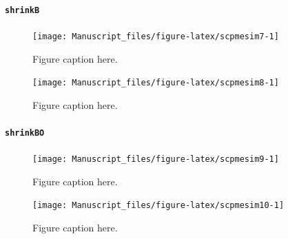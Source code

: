 \documentclass[11pt,]{report}
\let\oldparagraph\paragraph
\renewcommand{\paragraph}[1]{\oldparagraph{#1}\mbox{}}
\begin{document}
\hypertarget{shrinkb}{%
\paragraph{\texorpdfstring{\texttt{shrinkB}}{shrinkB}}\label{shrinkb}}

\vspace{1cm}

\begin{figure}

{\centering \texttt{[image: Manuscript\_files/figure-latex/scpmesim7-1]} 

}

\caption{Figure caption here.}\label{fig:scpmesim7}
\end{figure}

\vspace{1cm}

\begin{figure}

{\centering \texttt{[image: Manuscript\_files/figure-latex/scpmesim8-1]} 

}

\caption{Figure caption here.}\label{fig:scpmesim8}
\end{figure}

\hypertarget{shrinkbo}{%
\paragraph{\texorpdfstring{\texttt{shrinkBO}}{shrinkBO}}\label{shrinkbo}}

\vspace{1cm}

\begin{figure}

{\centering \texttt{[image: Manuscript\_files/figure-latex/scpmesim9-1]} 

}

\caption{Figure caption here.}\label{fig:scpmesim9}
\end{figure}

\vspace{1cm}

\begin{figure}

{\centering \texttt{[image: Manuscript\_files/figure-latex/scpmesim10-1]} 

}

\caption{Figure caption here.}\label{fig:scpmesim10}
\end{figure}

\vspace{1cm}
\end{document}
